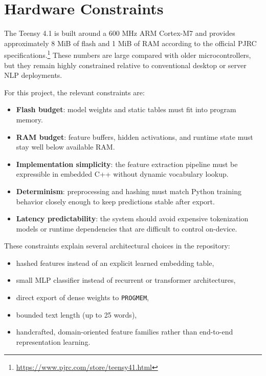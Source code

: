 \documentclass[11pt,a4paper]{article}
\begin{document}
\section{Hardware Constraints}

The Teensy 4.1 is built around a 600 MHz ARM Cortex-M7 and provides approximately 8 MiB of flash and 1 MiB of RAM according to the official PJRC specifications.\footnote{\url{https://www.pjrc.com/store/teensy41.html}} These numbers are large compared with older microcontrollers, but they remain highly constrained relative to conventional desktop or server NLP deployments.

For this project, the relevant constraints are:

\begin{itemize}
    \item \textbf{Flash budget}: model weights and static tables must fit into program memory.
    \item \textbf{RAM budget}: feature buffers, hidden activations, and runtime state must stay well below available RAM.
    \item \textbf{Implementation simplicity}: the feature extraction pipeline must be expressible in embedded C++ without dynamic vocabulary lookup.
    \item \textbf{Determinism}: preprocessing and hashing must match Python training behavior closely enough to keep predictions stable after export.
    \item \textbf{Latency predictability}: the system should avoid expensive tokenization models or runtime dependencies that are difficult to control on-device.
\end{itemize}

These constraints explain several architectural choices in the repository:

\begin{itemize}
    \item hashed features instead of an explicit learned embedding table,
    \item small MLP classifier instead of recurrent or transformer architectures,
    \item direct export of dense weights to \texttt{PROGMEM},
    \item bounded text length (up to 25 words),
    \item handcrafted, domain-oriented feature families rather than end-to-end representation learning.
\end{itemize}
\end{document}
